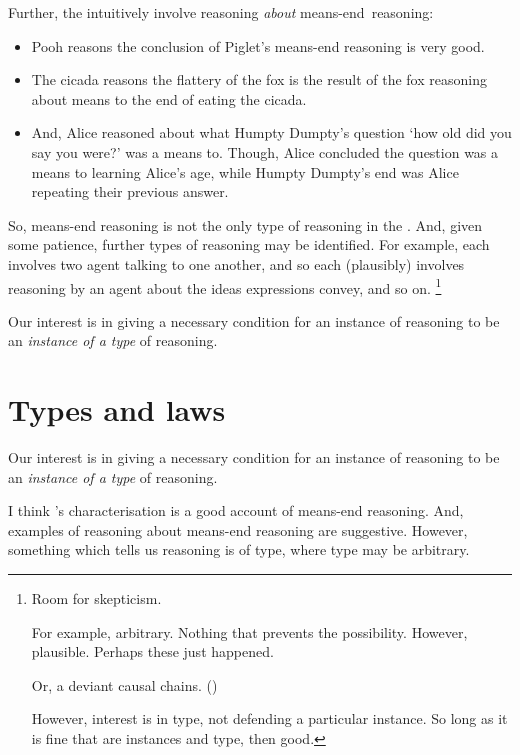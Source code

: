 \begin{note}
  Further, the  intuitively involve reasoning \emph{about} means-end~reasoning:

  \begin{itemize}
  \item
    Pooh reasons the conclusion of Piglet's means-end reasoning is very good.
  \item
    The cicada reasons the flattery of the fox is the result of the fox reasoning about means to the end of eating the cicada.
  \item
    And, Alice reasoned about what Humpty Dumpty's question `how old did you say you were?' was a means to.
    Though, Alice concluded the question was a means to learning Alice's age, while Humpty Dumpty's end was Alice repeating their previous answer.
  \end{itemize}

  \noindent%
  So, means-end reasoning is not the only type of reasoning in the .
  And, given some patience, further types of reasoning may be identified.
  For example, each  involves two agent talking to one another, and so each  (plausibly) involves reasoning by an agent about the ideas expressions convey, and so on.%
  \footnote{
    Room for skepticism.

  For example, arbitrary.
  Nothing that prevents the possibility.
  However, plausible.
  Perhaps these  just happened.

  Or, a deviant causal chains. (\cite[cf.][79]{Davidson:1973vd})

  However, interest is in type, not defending a particular instance.
  So long as it is fine that are instances and type, then good.
  }
\end{note}

\begin{note}
  Our interest is in giving a necessary condition for an instance of reasoning to be an \emph{instance of a type} of reasoning.
\end{note}

\section{Types and laws}
\label{cha:typical:laws}

\begin{note}
  Our interest is in giving a necessary condition for an instance of reasoning to be an \emph{instance of a type} of reasoning.

  I think \citeauthor{Pollock:2002aa}'s characterisation is a good account of means-end reasoning.
  And, examples of reasoning about means-end reasoning are suggestive.
  However, something which tells us reasoning is of type, where type may be arbitrary.
\end{note}

